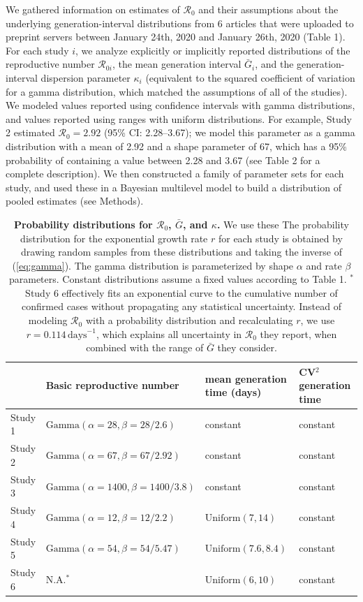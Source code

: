 \documentclass[12pt]{article}
\newcommand{\eref}[1]{(\ref{eq:#1})}
\begin{document}
We gathered information on estimates of $\mathcal R_0$ and their assumptions about the underlying generation-interval distributions from 6 articles that were uploaded to preprint servers between January 24th, 2020 and January 26th, 2020 (Table 1).
For each study $i$, we analyze explicitly or implicitly reported distributions of the reproductive number $\mathcal R_{0i}$, the mean generation interval $\bar G_i$, and the generation-interval dispersion parameter $\kappa_i$ (equivalent to the squared coefficient of variation for a gamma distribution, which matched the assumptions of all of the studies).
We modeled values reported using confidence intervals with gamma distributions, and values reported using ranges with uniform distributions.
For example, Study 2 estimated $\mathcal R_0 = 2.92$ (95\% CI: 2.28--3.67);
we model this parameter as a gamma distribution with a mean of 2.92 and a shape parameter of 67, which has a 95\% probability of containing a value between 2.28 and 3.67 (see Table 2 for a complete description).
We then constructed a family of parameter sets for each study, and used these in a Bayesian multilevel model to build a distribution of pooled estimates (see Methods).

\begin{table}[t]
\begin{center}
\footnotesize
\begin{tabular}{l|l|l|l}
 & Basic reproductive number & mean generation time (days) & CV$^2$ generation time \\
\hline
Study 1 & $\mathrm{Gamma}(\alpha=28, \beta=28/2.6)$ & constant & constant \\
\hline
Study 2 & $\mathrm{Gamma}(\alpha=67, \beta=67/2.92)$ & constant & constant \\
\hline
Study 3 & $\mathrm{Gamma}(\alpha=1400, \beta=1400/3.8)$ & constant & constant \\
\hline
Study 4 & $\mathrm{Gamma}(\alpha=12, \beta=12/2.2)$ & $\mathrm{Uniform}(7, 14)$ & constant\\
\hline
Study 5 & $\mathrm{Gamma}(\alpha=54, \beta=54/5.47)$ & $\mathrm{Uniform}(7.6, 8.4)$ & constant\\
\hline
Study 6 & N.A.$^\ast$ & $\mathrm{Uniform}(6, 10)$ & constant\\
\hline
\end{tabular}
\end{center}
\caption{
\textbf{Probability distributions for $\mathcal R_0$, $\bar G$, and $\kappa$.}
We use these 
The probability distribution for the exponential growth rate $r$ for each study is obtained by drawing random samples from these distributions and taking the inverse of \eref{gamma}.
The gamma distribution is parameterized by shape $\alpha$ and rate $\beta$ parameters.
Constant distributions assume a fixed values according to Table 1.
$^\ast$Study 6 effectively fits an exponential curve to the cumulative number of confirmed cases without propagating any statistical uncertainty.
Instead of modeling $\mathcal R_0$ with a probability distribution and recalculating $r$, we use $r=0.114\,\mathrm{days}^{-1}$, which explains all uncertainty in $\mathcal R_0$ they report, when combined with the range of $\bar G$ they consider.
}
\end{table}
\end{document}
